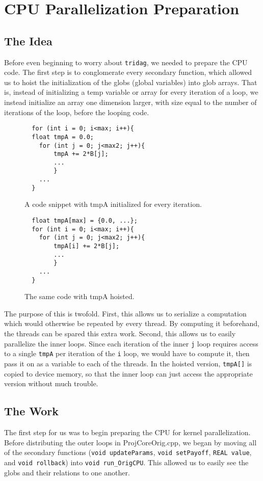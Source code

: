 \documentclass[]{report}
\title{}
\author{}
\begin{document}
\section{CPU Parallelization Preparation}
\subsection{The Idea}
Before even beginning to worry about \texttt{tridag}, we needed to prepare the CPU code. The first step is to conglomerate every secondary function, which allowed us to hoist the initialization of the globs (global variables) into glob arrays. That is, instead of initializing a temp variable or array for every iteration of a loop, we instead initialize an array one dimension larger, with size equal to the number of iterations of the loop, before the looping code.
\begin{figure}[h]
\begin{lstlisting}
  for (int i = 0; i<max; i++){
  float tmpA = 0.0;
  	for (int j = 0; j<max2; j++){
  		tmpA += 2*B[j];
  		...
  		}
  	...
  }
 \end{lstlisting}
 \caption{ A code snippet with tmpA initialized for every iteration.}
 \end{figure}
 \begin{figure}[h]
 \begin{lstlisting}
  float tmpA[max] = {0.0, ...};
  for (int i = 0; i<max; i++){
  	for (int j = 0; j<max2; j++){
  		tmpA[i] += 2*B[j];
  		...
  		}
  	...
  }
 \end{lstlisting}
 \caption{ The same code with tmpA hoisted.}
 \end{figure}
  
The purpose of this is twofold. First, this allows us to serialize a computation which would otherwise be repeated by every thread. By computing it beforehand, the threads can be spared this extra work. Second, this allows us to easily parallelize the inner loops. Since each iteration of the inner \texttt{j} loop requires access to a single \texttt{tmpA} per iteration of the \texttt{i} loop, we would have to compute it, then pass it on as a variable to each of the threads. In the hoisted version, \texttt{tmpA[]} is copied to device memory, so that the inner loop can just access the appropriate version without much trouble.
\subsection{The Work}
The first step for us was to begin preparing the CPU for kernel parallelization. Before distributing the outer loops in ProjCoreOrig.cpp,
we began by moving all of the secondary functions (\texttt{void updateParams}, \texttt{void setPayoff}, \texttt{REAL value}, and \texttt{void rollback}) into \texttt{void run\_OrigCPU}. This allowed us to easily see the globs and their relations to one another.
\end{document}
